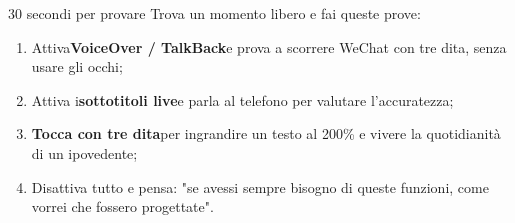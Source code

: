 \begin{tcbpractice}{30 secondi per provare}
Trova un momento libero e fai queste prove:

\begin{enumerate}
  \item Attiva\textbf{VoiceOver / TalkBack}e prova a scorrere WeChat con tre dita, senza usare gli occhi;
  \item Attiva i\textbf{sottotitoli live}e parla al telefono per valutare l'accuratezza;
  \item \textbf{Tocca con tre dita}per ingrandire un testo al 200\% e vivere la quotidianità di un ipovedente;
  \item Disattiva tutto e pensa: "se avessi sempre bisogno di queste funzioni, come vorrei che fossero progettate".
\end{enumerate}

\end{tcbpractice}
